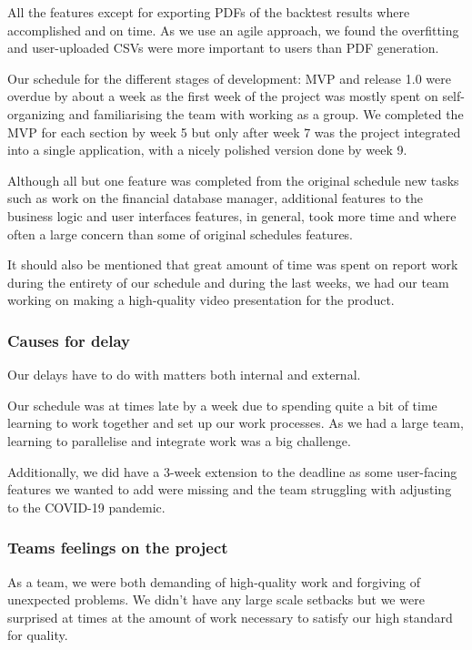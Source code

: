 \documentclass[main.tex]{subfiles}
\begin{document}
All the features except for exporting PDFs of the backtest results where
accomplished and on time. As we use an agile approach, we found the
overfitting and user-uploaded CSVs were more important to users than PDF
generation.

Our schedule for the different stages of development: MVP and release
1.0 were overdue by about a week as the first week of the project was
mostly spent on self-organizing and familiarising the team with working
as a group. We completed the MVP for each section by week 5 but only
after week 7 was the project integrated into a single application, with
a nicely polished version done by week 9.

Although all but one feature was completed from the original schedule
new tasks such as work on the financial database manager, additional
features to the business logic and user interfaces features, in general,
took more time and where often a large concern than some of original
schedules features.

It should also be mentioned that great amount of time was spent on
report work during the entirety of our schedule and during the last
weeks, we had our team working on making a high-quality video
presentation for the product.

\subsubsection{Causes for delay}\label{causes-for-delay}

Our delays have to do with matters both internal and external.

Our schedule was at times late by a week due to spending quite a bit of
time learning to work together and set up our work processes. As we had
a large team, learning to parallelise and integrate work was a big
challenge.

Additionally, we did have a 3-week extension to the deadline as some
user-facing features we wanted to add were missing and the team
struggling with adjusting to the COVID-19 pandemic.

\subsubsection{Teams feelings on the
project}\label{teams-feelings-on-the-project}

As a team, we were both demanding of high-quality work and forgiving of
unexpected problems. We didn't have any large scale setbacks but we were
surprised at times at the amount of work necessary to satisfy our high
standard for quality.
\end{document}
